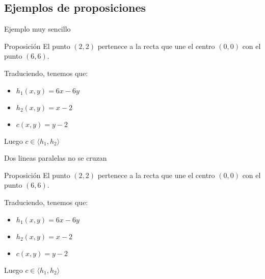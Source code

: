 \documentclass[10pt]{beamer}
\newcommand{\gen}[1]{\ensuremath{\langle #1\rangle}}
\begin{document}
\subsection{Ejemplos de proposiciones}
\begin{frame}{Ejemplo muy sencillo}

	\begin{block}{Proposición}
		El punto $(2,2)$ pertenece a la recta que une el centro $(0,0)$ con el punto $(6,6)$.
	\end{block}

	Traduciendo, tenemos que:

	\begin{itemize} 
		\item $h_1(x,y) = 6x-6y$
		\item $h_2(x,y) = x-2$
		\item $c(x,y) = y-2$
	\end{itemize}

	Luego $c \in \gen{h_1,h_2}$
\end{frame}

\begin{frame}{Dos lineas paralelas no se cruzan}

\begin{block}{Proposición}
	El punto $(2,2)$ pertenece a la recta que une el centro $(0,0)$ con el punto $(6,6)$.
\end{block}

Traduciendo, tenemos que:

\begin{itemize} 
	\item $h_1(x,y) = 6x-6y$
	\item $h_2(x,y) = x-2$
	\item $c(x,y) = y-2$
\end{itemize}

Luego $c \in \gen{h_1,h_2}$
\end{frame}
\end{document}
